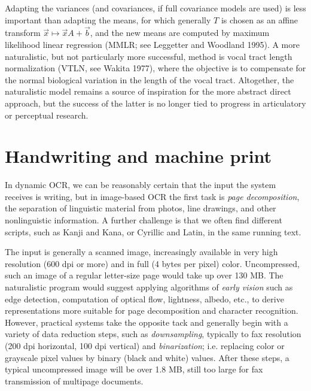 Adapting the variances (and covariances, if full covariance models are used)
is less important than adapting the means, for which generally $T$ is chosen
as an affine transform $\vec{x} \mapsto \vec{x}A+\vec{b}$, and the new means
are computed by maximum likelihood linear regression (MMLR; see Leggetter and
Woodland 1995).\nocite{Leggetter:1995} A more
naturalistic, but not particularly more successful, method is vocal tract
length normalization (VTLN, see Wakita 1977), \nocite{Wakita:1977}
where the objective is to compensate for the normal biological variation in
the length of the vocal tract. Altogether, the naturalistic model remains a
source of inspiration for the more abstract direct approach, but the success
of the latter is no longer tied to progress in articulatory or perceptual
research.

\section{Handwriting and machine print}

In dynamic OCR, we can be reasonably certain that the input the system receives
is writing, but in image-based OCR the first task is {\it page
  decomposition}, the separation of linguistic
material from photos, line drawings, and other nonlinguistic information.  A
further challenge is that we often find different scripts, such as Kanji and
Kana, or Cyrillic and Latin, in the same running text. 

The input is generally a scanned image, increasingly available in very high
resolution (600 dpi or more) and in full (4 bytes per pixel) color.
Uncompressed, such an image of a regular letter-size page would take up over
130 MB. The naturalistic program would suggest applying algorithms of {\it
  early vision} such as edge detection, computation of optical flow,
lightness, albedo, etc., to derive representations more suitable for page
decomposition and character recognition. However, practical systems take the
opposite tack and generally begin with a variety of data reduction steps, such
as {\it downsampling}, typically to fax resolution (200
dpi horizontal, 100 dpi vertical) and {\it binarization};
i.e. replacing color or grayscale pixel values by binary (black and white)
values.  After these steps, a typical uncompressed image will be over 1.8 MB,
still too large for fax transmission of multipage documents.

